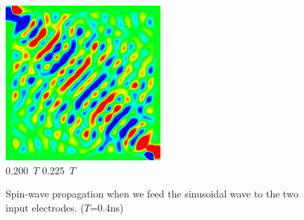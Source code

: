 \documentclass[a4j, twocolumn]{jsarticle}
\begin{document}
\begin{figure}
\includegraphics[width=0.4\hsize]{./figures/capture/sin/sinsqr128_32i_l_dif_5770} \\
0.200\ $T$ \hspace*{0.25\hsize} 0.225\ $T$  \vspace{5pt}\\
\caption{
Spin-wave propagation when we feed the sinusoidal wave to the two input electrodes. ($T$=0.4ns)
}
\label{fig:waves1xsin}
\end{figure}
\end{document}
